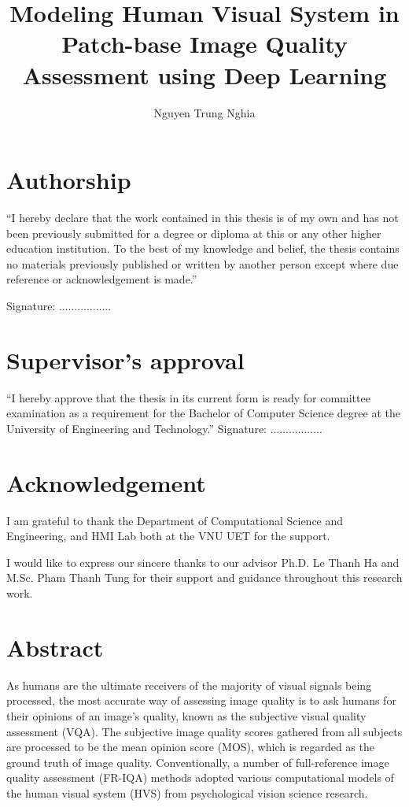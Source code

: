 \documentclass[12pt]{report}
\title{Modeling Human Visual System in Patch-base Image Quality Assessment using Deep Learning}	%
\author{Nguyen Trung Nghia}			%
\begin{document}
%
\maketitle

%
\chapter*{Authorship}
“I hereby declare that the work contained in this thesis is of my own and has not been
previously submitted for a degree or diploma at this or any other higher education
institution. To the best of my knowledge and belief, the thesis contains no materials
previously published or written by another person except where due reference or
acknowledgement is made.”

Signature: .................

%
\chapter*{Supervisor’s approval}

“I hereby approve that the thesis in its current form is ready for committee examination
as a requirement for the Bachelor of Computer Science degree at the University of
Engineering and Technology.”
\newline
Signature: .................


\chapter*{Acknowledgement}

I am grateful to thank the Department of Computational Science and Engineering, and HMI Lab both at the VNU UET for the support.

I would like to express our sincere thanks to our advisor Ph.D. Le Thanh Ha and M.Sc. Pham Thanh Tung for their support and guidance throughout this research work.
%
\chapter*{Abstract}

As humans are the ultimate receivers of the majority of visual signals being processed, the most accurate way of assessing image quality is to ask humans for their opinions of an image’s quality, known as the subjective visual quality assessment (VQA). The subjective image quality scores gathered from all subjects are processed to be the mean opinion score (MOS), which is regarded as the ground truth of image quality. Conventionally, a number of full-reference image quality assessment (FR-IQA) methods adopted various computational models of the human visual system (HVS) from psychological vision science research.
\end{document}
